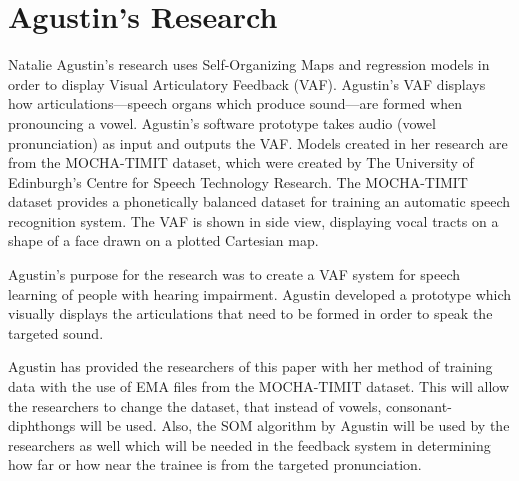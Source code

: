 \section{Agustin's Research}
Natalie Agustin's research uses Self-Organizing Maps and regression models in order to display Visual Articulatory Feedback (VAF). Agustin's VAF displays how articulations---speech organs which produce sound---are formed when pronouncing a vowel. Agustin's software prototype takes audio (vowel pronunciation) as input and outputs the VAF. Models created in her research are from the MOCHA-TIMIT dataset, which were created by The University of Edinburgh's Centre for Speech Technology Research. The MOCHA-TIMIT dataset provides a phonetically balanced dataset for training an automatic speech recognition system. The VAF is shown in side view, displaying vocal tracts on a shape of a face drawn on a plotted Cartesian map.

Agustin's purpose for the research was to create a VAF system for speech learning of people with hearing impairment. Agustin developed a prototype which visually displays the articulations that need to be formed in order to speak the targeted sound.

Agustin has provided the researchers of this paper with her method of training data with the use of EMA files from the MOCHA-TIMIT dataset. This will allow the researchers to change the dataset, that instead of vowels, consonant-diphthongs will be used. Also, the SOM algorithm by Agustin will be used by the researchers as well which will be needed in the feedback system in determining how far or how near the trainee is from the targeted pronunciation.